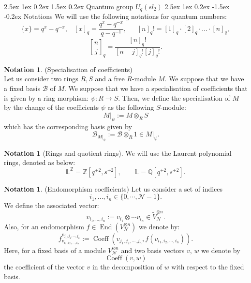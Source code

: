 \documentclass[reqno,a4paper,11pt]{amsart}
\makeatletter
\numberwithin{equation}{section}
\numberwithin{figure}{section}
\theoremstyle{definition}
\newtheorem{notation}[defn]{Notation}
\theoremstyle{plain}
\renewcommand*{\section}{\@startsection{section}{1}{\z@}%
	{2.5ex \@plus 1ex \@minus 0.2ex}%
	{1.5ex \@plus 0.2ex}%
	{\normalfont\normalsize\bfseries}}
\renewcommand*{\subsection}{\@startsection{subsection}{2}{\z@}%
	{2.5ex \@plus 1ex \@minus 0.2ex}%
	{-1.5ex \@plus -0.2ex}%
	{\normalfont\normalsize\bfseries}}
\newcommand{\coeff}{\operatorname{Coeff}}
\newcommand{\Z}{\mathbb Z}
\newcommand{\Li}{{\mathbb L}}
\newcommand{\Liq}{\mathbb L}
\newcommand{\cN}{\mathcal{N}}
\makeatother
\begin{document}
\section{Quantum group ${U}_q(sl_2)$}
%
\subsection{Notations}\label{Not}
We will use the following notations for quantum numbers:
$$ 
\{ x \} =q^x-q^{-x}, \ \ \ \
 [x]_{q}= \frac{q^x-q^{-x}}{q-q^{-1}}, \ \ \ \ \ \ \ 
 [n]_q!=[1]_q \cdot [2]_q \cdot \ldots \cdot [n]_q,
$$
$$
{n \brack j}_q=\frac{[n]_q!}{[n-j]_q! [j]_q!}.
$$
%
\begin{notation}(Specialisation of coefficients)\label{N:spec}\\ 
Let us consider two rings $R,S$ and a free $R$-module $M$. We suppose that we have a fixed basis $\mathscr B$ of $M$. We suppose that we have a specialisation of coefficients that is given by a ring morphism:
$\psi: R \rightarrow S.$
Then, we define the specialisation of $M$ by the change of the coefficients $\psi$ as the following $S$-module: $$M|_{\psi}:=M \otimes_{R} S$$ which has the corresponding basis given by 
$$
\mathscr B_{M|_{\psi}}:=\mathscr B \otimes_{R}1 \in M|_{\psi}. 
$$
\end{notation}
%
\begin{notation}[Rings and quotient rings] 
We will use the Laurent polynomial rings, denoted as below:
\[
\Li^{\Z}=\mathbb Z[q^{\pm2}, s^{\pm 2}],  \qquad
\Liq=\mathbb Q[q^{\pm2}, s^{\pm 2}].
\]
\end{notation}
{
\begin{notation}(Endomorphism coefficients) \label{endcoeff}Let us consider a set of indices 
$$
i_1,...,i_{n} \in \{ 0, \cdots, \cN-1\}.
$$
We define the associated vector: 
%
$$
v_{i_1,...,i_n}:=v_{i_1}\otimes \cdots v_{i_n} \in \widetilde{V}_{\cN}^{\otimes n}.
$$
%
Also, for an endomorphism $f \in \operatorname{End}(V_{\cN}^{\otimes n})$ we denote by:
\begin{equation}
f_{v_{i_1,i_2, \cdots, i_n}}^{v_{j_1,j_2, \cdots, j_n}}:=\coeff(v_{j_1,j_2, \cdots, j_n}, f(v_{i_1,i_2, \cdots, i_n})).
\end{equation}
Here, for a fixed basis of a module $V_{\cN}^{\otimes n}$ and two basis vectors $v$, $w$ we denote by 
$$\coeff(v,w)$$ 
the coefficient of the vector $v$ in the decomposition of $w$ with respect to the fixed basis.
\end{notation}}
%
\end{document}
